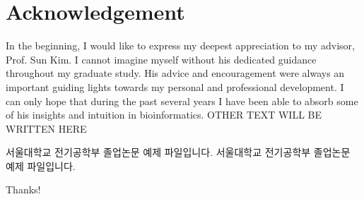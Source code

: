 \documentclass[oneside,phd]{snuthesis}
\begin{document}
\section*{Acknowledgement}
In the beginning, I would like to express my deepest appreciation to my advisor, Prof. Sun Kim.
I cannot imagine myself without his dedicated guidance throughout my graduate study.
His advice and encouragement were always an important guiding lights towards my personal and professional development.
I can only hope that during the past several years I have been able to absorb some of his insights and intuition in bioinformatics.
OTHER TEXT WILL BE WRITTEN HERE






\begin{abstractalt}
서울대학교 전기공학부 졸업논문 예제 파일입니다.
서울대학교 전기공학부 졸업논문 예제 파일입니다.
\end{abstractalt}

\acknowledgement
Thanks!
\end{document}
